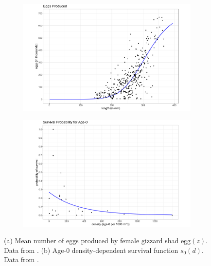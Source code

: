 \documentclass[preprint,review,12pt,authoryear]{elsarticle}
\begin{document}
\begin{figure}
\centering
\begin{subfigure}[b]{.43\textwidth}
  \includegraphics[width=\textwidth]{figures/eggs.png}
  \caption{}
  \label{fig:eggs}
\end{subfigure}
\begin{subfigure}[b]{.43\textwidth}
  \includegraphics[width=\textwidth]{figures/age0surv.png}
  \caption{}
  \label{fig:surv_age0}
\end{subfigure}
\caption{(a) Mean number of eggs produced by female gizzard shad $\mbox{egg}(z)$. Data from \citep{jons1997ovarian}.  (b) Age-0 density-dependent survival function $s_0(d)$. Data from \citep{michaletz2010overwinter}. }
\label{fig:fecundity}
\end{figure}    
\end{document}
